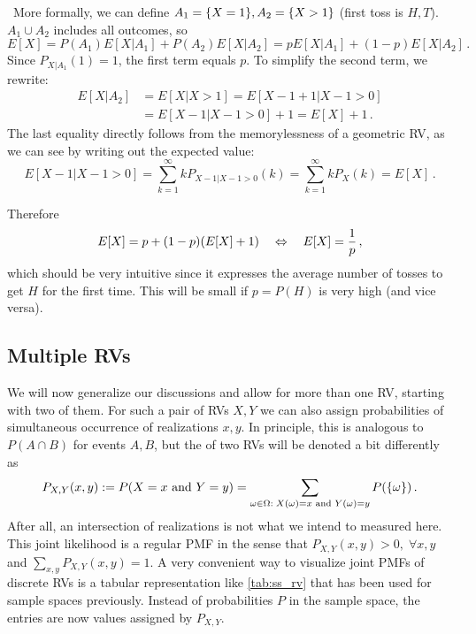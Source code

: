 \begin{ex}[Memorylessness]
~More formally, we can define $A_1 = \qty{X = 1}, A_2 = \qty{X > 1}$ (first toss is $H, T$). $A_1 \cup A_2$ includes all outcomes, so
\begin{equation*}
E[X] = P(A_1) E[X | A_1] + P(A_2) E[X | A_2] = p E[X | A_1] + (1 - p) E[X | A_2] \, .
\end{equation*}
Since $P_{X | A_1}(1) = 1$, the first term equals $p$. To simplify the second term, we rewrite:
\begin{align*}
E[X | A_2] &= E[X | X > 1] = E[X - 1 + 1 | X - 1 > 0]
\\
&= E[X - 1 | X - 1 > 0] + 1 = E[X] + 1 \, .
\end{align*}
The last equality directly follows from the memorylessness of a geometric RV, as we can see by writing out the expected value:
\begin{equation*}
E[X - 1 | X - 1 > 0] = \sum_{k = 1}^\infty k P_{X - 1 | X - 1 > 0}(k) = \sum_{k = 1}^\infty k P_X(k) = E[X] \, .
\end{equation*}

Therefore
\begin{equation*}
E[X] = p + (1 - p) \qty(E[X] + 1) \quad \Leftrightarrow \quad E[X] = \frac{1}{p} \, ,
\end{equation*}
which should be very intuitive since it expresses the average number of tosses to get $H$ for the first time. This will be small if $p = P(H)$ is very high (and vice versa).
\end{ex}



	\subsection{Multiple RVs}
We will now generalize our discussions and allow for more than one RV, starting with two of them. For such a pair of RVs $X, Y$ we can also assign probabilities of simultaneous occurrence of realizations $x, y$. In principle, this is analogous to $P(A \cap B)$ for events $A, B$, but the  of two RVs will be denoted a bit differently as
\begin{equation}
P_{X, Y}(x, y) := P(X = x \text{ and } Y = y) = \sum_{\omega \in \Omega: \; X(\omega) = x \text{ and } Y(\omega) = y} P(\qty{\omega}) \, .
\end{equation}
After all, an intersection of realizations is not what we intend to measured here. This joint likelihood is a regular PMF in the sense that $P_{X, Y}(x, y) > 0, \; \forall x, y$ and $\sum_{x, y} P_{X, Y}(x, y) = 1$. A very convenient way to visualize joint PMFs of discrete RVs is a tabular representation like \ref{tab:ss_rv} that has been used for sample spaces previously. Instead of probabilities $P$ in the sample space, the entries are now values assigned by $P_{X, Y}$.



